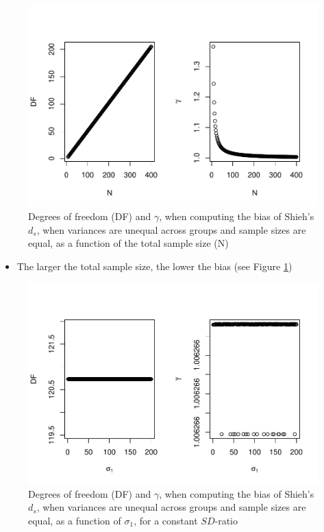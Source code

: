 \documentclass[
  man]{apa6}
\providecommand{\tightlist}{%
  \setlength{\itemsep}{0pt}\setlength{\parskip}{0pt}}
\begin{document}
\begin{figure}
\centering
\includegraphics{Theoretical-Bias-of-all-estimators-as-a-function-of-population-parameters_files/figure-latex/biasshiehhetbalNsize2-1.pdf}
\caption{\label{fig:biasshiehhetbalNsize2}Degrees of freedom (DF) and \(\gamma\), when computing the bias of Shieh's \(d_s\), when variances are unequal across groups and sample sizes are equal, as a function of the total sample size (N)}
\end{figure}

\begin{itemize}
\tightlist
\item
  The larger the total sample size, the lower the bias (see Figure \ref{fig:biasshiehhetbalNsize2})
\end{itemize}

\begin{figure}
\centering
\includegraphics{Theoretical-Bias-of-all-estimators-as-a-function-of-population-parameters_files/figure-latex/biasshiehhetbalvariance2-1.pdf}
\caption{\label{fig:biasshiehhetbalvariance2}Degrees of freedom (DF) and \(\gamma\), when computing the bias of Shieh's \(d_s\), when variances are unequal across groups and sample sizes are equal, as a function of \(\sigma_1\), for a constant \(SD\)-ratio}
\end{figure}
\end{document}
